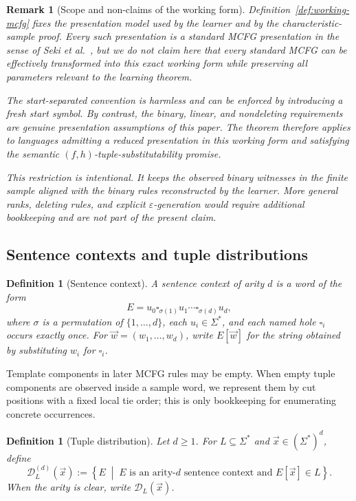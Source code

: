 \documentclass[11pt,a4paper]{article}
\newtheorem{definition}[theorem]{Definition}
\newtheorem{remark}[theorem]{Remark}
\theoremstyle{remark}
\newcommand{\D}{\mathcal{D}}
\newcommand{\tuple}[1]{\vec{#1}}
\newcommand{\blank}{\square}
\newcommand{\eps}{\varepsilon}
\begin{document}
\begin{remark}[Scope and non-claims of the working form]
\label{rem:working-form-scope}
Definition~\ref{def:working-mcfg} fixes the presentation model used by the
learner and by the characteristic-sample proof.  Every such presentation is a
standard MCFG presentation in the sense of Seki et al.~\cite{SekiEtAl1991}, but
we do not claim here that every standard MCFG can be effectively transformed
into this exact working form while preserving all parameters relevant to the
learning theorem.

The start-separated convention is harmless and can be enforced by introducing a
fresh start symbol.  By contrast, the binary, linear, and nondeleting
requirements are genuine presentation assumptions of this paper.  The theorem
therefore applies to languages admitting a reduced presentation in this working
form and satisfying the semantic \((f,h)\)-tuple-substitutability promise.

This restriction is intentional.  It keeps the observed binary witnesses in the
finite sample aligned with the binary rules reconstructed by the learner.  More
general ranks, deleting rules, and explicit \(\eps\)-generation would require
additional bookkeeping and are not part of the present claim.
\end{remark}

\subsection{Sentence contexts and tuple distributions}

\begin{definition}[Sentence context]
\label{def:sentence-context}
A \emph{sentence context of arity \(d\)} is a word of the form
\[
  E=u_0\blank_{\sigma(1)}u_1\cdots\blank_{\sigma(d)}u_d,
\]
where \(\sigma\) is a permutation of \(\{1,\ldots,d\}\), each
\(u_i\in\Sigma^*\), and each named hole
\(\blank_i\) occurs exactly once.  For \(\tuple w=(w_1,\ldots,w_d)\), write
\(E[\tuple w]\) for the string obtained by substituting \(w_i\) for
\(\blank_i\).
\end{definition}

Template components in later MCFG rules may be empty.  When empty tuple
components are observed inside a sample word, we represent them by cut positions
with a fixed local tie order; this is only bookkeeping for enumerating concrete
occurrences.

\begin{definition}[Tuple distribution]
\label{def:tuple-distribution}
Let \(d\ge1\).  For \(L\subseteq\Sigma^*\) and
\(\tuple x\in(\Sigma^*)^d\), define
\[
  \D_L^{(d)}(\tuple x)
  :=
  \left\{
    E
    \;\middle|\;
    E\text{ is an arity-}d\text{ sentence context and }
    E[\tuple x]\in L
  \right\}.
\]
When the arity is clear, write \(\D_L(\tuple x)\).
\end{definition}
\end{document}
